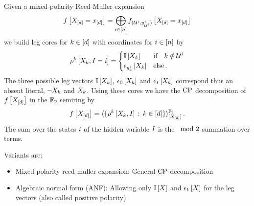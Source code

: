 Given a mixed-polarity Reed-Muller expansion
\begin{align*}
    f\left[X_{[d]}=x_{[d]}\right]
    = \bigoplus_{i\in[n]} f_{(\mathcal{U}^{i},y_{\mathcal{U}^{i}}^{i})}\left[X_{[d]}=x_{[d]}\right]
\end{align*}
we build leg cores for $k\in[d]$ with coordinates for $i\in[n]$ by
\begin{align*}
    \rho^{k}\left[X_{k},I=i\right]
    = \begin{cases}
          \mathbb{I}\left[X_{k}\right] & \text{if}\quad k\notin\mathcal{U}^{i} \\
          \epsilon_{y_{k}^{i}}\left[X_{k}\right] & \text{else} \, .
    \end{cases}
\end{align*}
The three possible leg vectors $\mathbb{I}\left[X_{k}\right]$, $\epsilon_{0}\left[X_{k}\right]$ and $\epsilon_{1}\left[X_{k}\right]$ correspond thus an absent literal, $\lnot X_{k}$ and $X_{k}$.
Using these cores we have the $\mathrm{CP}$ decomposition of $f\left[X_{[d]}\right]$ in the $\mathbb{F}_2$ semiring by
\begin{align*}
    f\left[X_{[d]}\right]
    = \langle
        \{\rho^{k}\left[X_{k},I\right] \,:\, k\in[d]\}
    \rangle^{\mathbb{F}_2}_{[X_{[d]}]} \, .
\end{align*}
The sum over the states $i$ of the hidden variable $I$ is the $\,\,\,\mathrm{mod}\,\, 2$ summation over terms.



Variants are:
\begin{itemize}
    \item Mixed polarity reed-muller expansion: General $\mathrm{CP}$ decomposition
    \item Algebraic normal form (ANF): Allowing only $\mathbb{I}\left[X\right]$ and $\epsilon_{1}\left[X\right]$ for the leg vectors (also called positive polarity)
\end{itemize}


